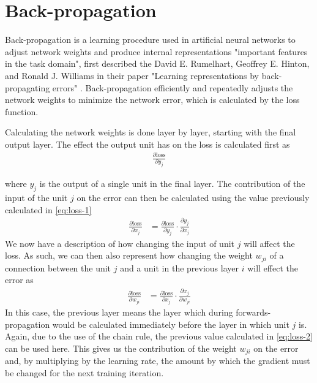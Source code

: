 \section{Back-propagation}\label{section:background-backpropagation}
Back-propagation is a learning procedure used in artificial neural networks to adjust network weights and produce internal representations "important features in the task domain", first described the David E. Rumelhart, Geoffrey E. Hinton, and Ronald J. Williams in their paper "Learning representations by back-propagating errors" \cite{backprop}.
Back-propagation efficiently and repeatedly adjusts the network weights to minimize the network error, which is calculated by the loss function.

Calculating the network weights is done layer by layer, starting with the final output layer.
The effect the output unit has on the loss is calculated first as
\begin{align}\label{eq:loss-1}
	\frac{\partial \text{loss}}{\partial y_j}
\end{align}

where $y_j$ is the output of a single unit in the final layer.
The contribution of the input of the unit $j$ on the error can then be calculated using the value previously calculated in \eqref{eq:loss-1}
\begin{align}\label{eq:loss-2}
	\frac{\partial \text{loss}}{\partial x_j} &= \frac{\partial \text{loss}}{\partial y_j} \cdot \frac{\partial y_j}{\partial x_j}
\end{align}
We now have a description of how changing the input of unit $j$ will affect the loss.
As such, we can then also represent how changing the weight $w_{ji}$ of a connection between the unit $j$ and a unit in the previous layer $i$ will effect the error as
\begin{align}\label{eq:loss-3}
	\frac{\partial \text{loss}}{\partial w_{ji}} &= \frac{\partial \text{loss}}{\partial x_j} \cdot \frac{\partial x_j}{\partial w_{ji}}
\end{align}
In this case, the previous layer means the layer which during forwards-propagation would be calculated immediately before the layer in which unit $j$ is.
Again, due to the use of the chain rule, the previous value calculated in \eqref{eq:loss-2} can be used here.
This gives us the contribution of the weight $w_{ji}$ on the error and, by multiplying by the learning rate, the amount by which the gradient must be changed for the next training iteration.

